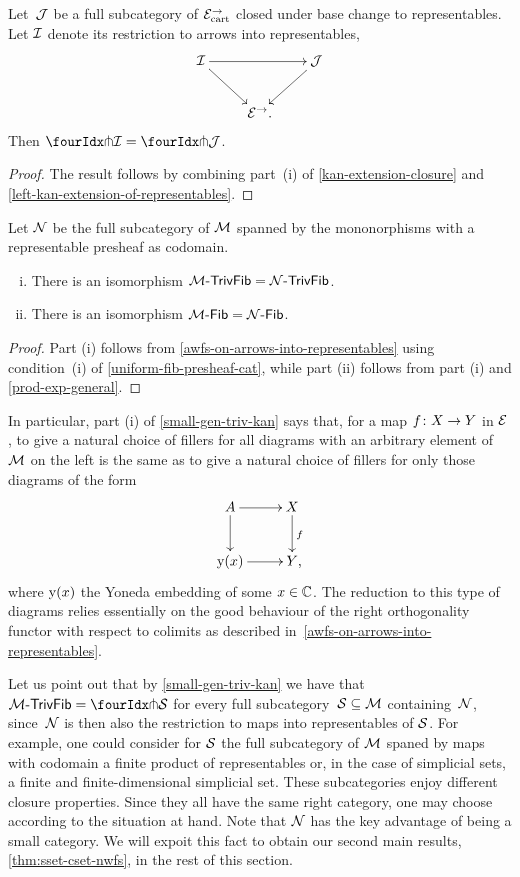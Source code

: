 \documentclass[reqno,10pt,a4paper,oneside,draft]{amsart}
\begin{document}
\begin{proposition} \label{awfs-on-arrows-into-representables}
Let~$\cal{J}$ be a full subcategory of $\catE_{\cart}^\to$ closed under base change to representables.
Let $\cal{I}$ denote its restriction to arrows into representables,
\[
\xymatrix{
  \cal{I}
  \ar[rr]
  \ar[dr]
&&
  \cal{J}
  \ar[dl]
\\&
  \catE^\to
\rlap{.}}
\]
Then $\liftr{\cal{I}} = \liftr{\cal{J}}$.
\end{proposition}

\begin{proof}
The result follows by combining part~(i) of \cref{kan-extension-closure} and \cref{left-kan-extension-of-representables}.
\end{proof}

\begin{theorem} \label{small-gen-triv-kan}
Let $\cal{N}$ be the full subcategory of $\cal{M}$ spanned by the mononorphisms with a representable presheaf as codomain.
\begin{enumerate}[(i)]
\item There is an isomorphism $\TrivFib{\cal{M}} = \TrivFib{\cal{N}}$.
\item There is an isomorphism $\Fib{\cal{M}} = \Fib{\cal{N}}$.
\end{enumerate}
\end{theorem}

\begin{proof}
Part (i) follows from \cref{awfs-on-arrows-into-representables} using condition~(i) of \cref{uniform-fib-presheaf-cat}, while part (ii) follows from part (i) and \cref{prod-exp-general}.
\end{proof}

In particular, part (i) of \cref{small-gen-triv-kan} says that, for a map $f \co X \to Y$ in $\catE$, to give a natural choice of fillers for all diagrams with an arbitrary element of $\cal{M}$ on the left is the same as to give a natural choice of fillers for only those diagrams of the form
\[
\xymatrix{
  A
  \ar[r]
  \ar[d]
&
  X
  \ar[d]^f
\\
  \yon(x)
  \ar[r]
&
  Y
\rlap{,}}
\]
where $\yon(x)$ the Yoneda embedding of some $x \in \catC$.
The reduction to this type of diagrams relies essentially on the good behaviour of the right orthogonality functor with respect to colimits as described in~\cref{awfs-on-arrows-into-representables}.

Let us point out that by \cref{small-gen-triv-kan} we have that $\TrivFib{\cal{M}} = \liftr{\cal{S}}$ for every full subcategory~$\cal{S} \subseteq \cal{M}$ containing~$\cal{N}$, since~$\cal{N}$ is then also the restriction to maps into representables of $\cal{S}$.
For example, one could consider for $\cal{S}$ the full subcategory of $\cal{M}$ spaned by maps with codomain a finite product of representables or, in the case of simplicial sets, a finite and finite-dimensional simplicial set.
These subcategories enjoy different closure properties.
Since they all have the same right category, one may choose according to the situation at hand.
Note that $\cal{N}$ has the key advantage of being a small category.
We will expoit this fact to obtain our second main results, \cref{thm:sset-cset-nwfs}, in the rest of this section.
\end{document}
